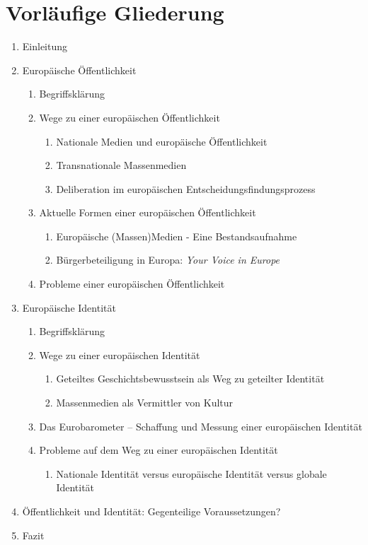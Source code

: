 \documentclass[a4paper, german, oneside]{scrartcl}
\begin{document}
\section{Vorläufige Gliederung}


\begin{enumerate}
	\item Einleitung
	\item Europäische Öffentlichkeit
	\begin{enumerate}
		\item Begriffsklärung
		\item Wege zu einer europäischen Öffentlichkeit
		\begin{enumerate}
			\item Nationale Medien und europäische Öffentlichkeit
			\item Transnationale Massenmedien 
			\item Deliberation im europäischen Entscheidungsfindungsprozess
		\end{enumerate}
		\item Aktuelle Formen einer europäischen Öffentlichkeit
		\begin{enumerate}
			\item Europäische (Massen)Medien - Eine Bestandsaufnahme
			\item Bürgerbeteiligung in Europa: \emph{Your Voice in Europe}
		\end{enumerate}
		\item Probleme einer europäischen Öffentlichkeit
	\end{enumerate}
	\item Europäische Identität
	\begin{enumerate}
		\item Begriffsklärung
		\item Wege zu einer europäischen Identität
		\begin{enumerate}
			\item Geteiltes Geschichtsbewusstsein als Weg zu geteilter Identität
			\item Massenmedien als Vermittler von Kultur
		\end{enumerate}
		\item Das Eurobarometer -- Schaffung und Messung einer europäischen Identität 
		\item Probleme auf dem Weg zu einer europäischen Identität
		\begin{enumerate}
			\item Nationale Identität versus europäische Identität versus globale Identität 
		\end{enumerate}
	\end{enumerate}
	\item Öffentlichkeit und Identität: Gegenteilige Voraussetzungen?
	\item Fazit
\end{enumerate}
\end{document}
